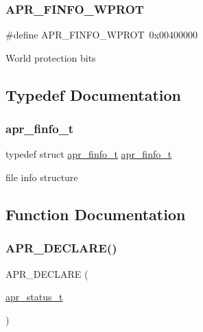 \subsubsection{\texorpdfstring{A\+P\+R\+\_\+\+F\+I\+N\+F\+O\+\_\+\+W\+P\+R\+OT}{APR\_FINFO\_WPROT}}
{\footnotesize\ttfamily \#define A\+P\+R\+\_\+\+F\+I\+N\+F\+O\+\_\+\+W\+P\+R\+OT~0x00400000}

World protection bits 

\subsection{Typedef Documentation}
\mbox{\label{group__apr__file__stat_ga3d390fdda1d16ae462c11b2d3b18efd1}} 
\subsubsection{\texorpdfstring{apr\+\_\+finfo\+\_\+t}{apr\_finfo\_t}}
{\footnotesize\ttfamily typedef struct \mbox{\hyperlink{structapr__finfo__t}{apr\+\_\+finfo\+\_\+t}} \mbox{\hyperlink{structapr__finfo__t}{apr\+\_\+finfo\+\_\+t}}}

file info structure 

\subsection{Function Documentation}
\mbox{\label{group__apr__file__stat_gaf4677630103e7b0971a3a5967fb7d829}} 
\subsubsection{\texorpdfstring{A\+P\+R\+\_\+\+D\+E\+C\+L\+A\+R\+E()}{APR\_DECLARE()}}
{\footnotesize\ttfamily A\+P\+R\+\_\+\+D\+E\+C\+L\+A\+RE (\begin{DoxyParamCaption}\item[{\mbox{\hyperlink{group__apr__errno_gaf76ee4543247e9fb3f3546203e590a6c}{apr\+\_\+status\+\_\+t}}}]{ }\end{DoxyParamCaption})}

